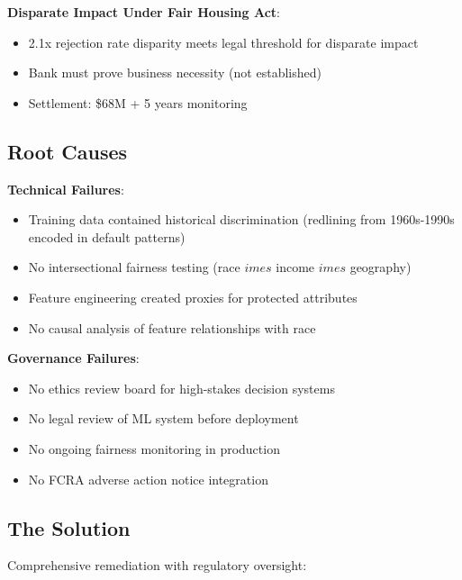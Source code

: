 \textbf{Disparate Impact Under Fair Housing Act}:
\begin{itemize}
    \item 2.1x rejection rate disparity meets legal threshold for disparate impact
    \item Bank must prove business necessity (not established)
    \item Settlement: \$68M + 5 years monitoring
\end{itemize}

\subsection{Root Causes}

\textbf{Technical Failures}:
\begin{itemize}
    \item Training data contained historical discrimination (redlining from 1960s-1990s encoded in default patterns)
    \item No intersectional fairness testing (race $	imes$ income $	imes$ geography)
    \item Feature engineering created proxies for protected attributes
    \item No causal analysis of feature relationships with race
\end{itemize}

\textbf{Governance Failures}:
\begin{itemize}
    \item No ethics review board for high-stakes decision systems
    \item No legal review of ML system before deployment
    \item No ongoing fairness monitoring in production
    \item No FCRA adverse action notice integration
\end{itemize}

\subsection{The Solution}

Comprehensive remediation with regulatory oversight:


